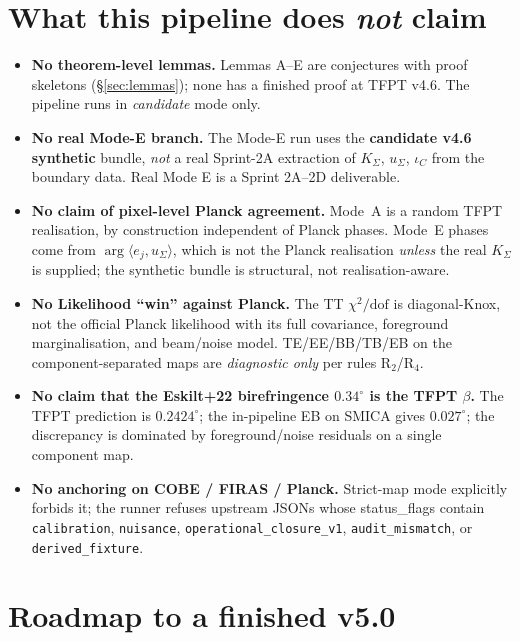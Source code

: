 \documentclass[11pt,a4paper]{article}
\begin{document}
\section{What this pipeline does \emph{not} claim}
\label{sec:nonclaims}

\begin{itemize}[leftmargin=1.4em]
\item \textbf{No theorem-level lemmas.}  Lemmas A--E are conjectures
with proof skeletons (\S\ref{sec:lemmas}); none has a finished proof
at TFPT v4.6.  The pipeline runs in \emph{candidate} mode only.
\item \textbf{No real Mode-E branch.}  The Mode-E run uses the
\textbf{candidate v4.6 synthetic} bundle, \emph{not} a real
Sprint-2A extraction of \(K_\Sigma\), \(u_\Sigma\), \(\iota_C\) from
the boundary data.  Real Mode E is a Sprint 2A--2D deliverable.
\item \textbf{No claim of pixel-level Planck agreement.}  Mode~A is a
random TFPT realisation, by construction independent of Planck phases.
Mode~E phases come from \(\arg\langle e_j,u_\Sigma\rangle\), which
is not the Planck realisation \emph{unless} the real
\(K_\Sigma\) is supplied; the synthetic bundle is structural, not
realisation-aware.
\item \textbf{No Likelihood ``win'' against Planck.}  The TT
\(\chi^2/\mathrm{dof}\) is diagonal-Knox, not the official Planck
likelihood with its full covariance, foreground marginalisation, and
beam/noise model.  TE/EE/BB/TB/EB on the component-separated maps are
\emph{diagnostic only} per rules R\(_2\)/R\(_4\).
\item \textbf{No claim that the Eskilt+22 birefringence
\(0.34^\circ\) is the TFPT \(\beta\).}  The TFPT prediction is
\(0.2424^\circ\); the in-pipeline EB on SMICA gives
\(0.027^\circ\); the discrepancy is dominated by foreground/noise
residuals on a single component map.
\item \textbf{No anchoring on COBE / FIRAS / Planck.}  Strict-map mode
explicitly forbids it; the runner refuses upstream JSONs whose
\textsf{status\_flags} contain \texttt{calibration},
\texttt{nuisance}, \texttt{operational\_closure\_v1},
\texttt{audit\_mismatch}, or \texttt{derived\_fixture}.
\end{itemize}

\section{Roadmap to a finished v5.0}
\label{sec:roadmap}
\end{document}
